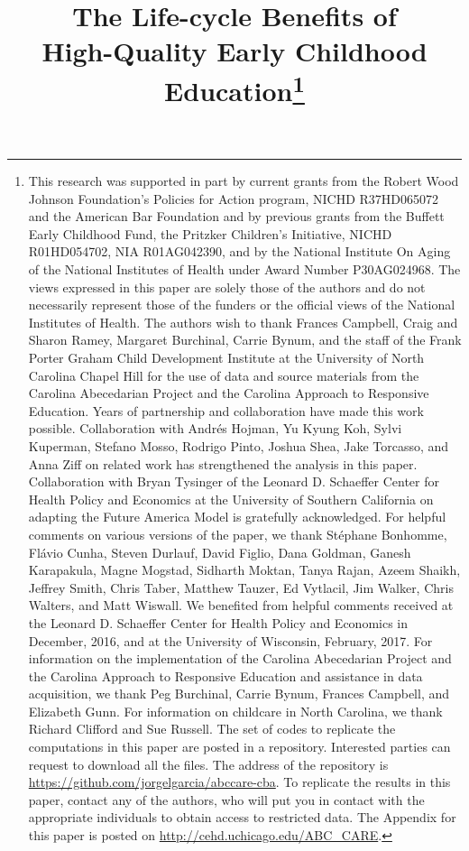 \begin{titlepage}
\title{\Large \textbf{The Life-cycle Benefits of \\ High-Quality Early Childhood Education}\thanks{This research was supported in part by current grants from the Robert Wood Johnson Foundation's Policies for Action program, NICHD R37HD065072 and the American Bar Foundation and by previous grants from the Buffett Early Childhood Fund, the Pritzker Children's Initiative, NICHD R01HD054702, NIA R01AG042390, and by the National Institute On Aging of the National Institutes of Health under Award Number P30AG024968. The views expressed in this paper are solely those of the authors and do not necessarily represent those of the funders or the official views of the National Institutes of Health. The authors wish to thank Frances Campbell, Craig and Sharon Ramey, Margaret Burchinal, Carrie Bynum, and the staff of the Frank Porter Graham Child Development Institute at the University of North Carolina Chapel Hill for the use of data and source materials from the Carolina Abecedarian Project and the Carolina Approach to Responsive Education. Years of partnership and collaboration have made this work possible. Collaboration with Andr\'{e}s Hojman, Yu Kyung Koh, Sylvi Kuperman, Stefano Mosso, Rodrigo Pinto, Joshua Shea, Jake Torcasso, and Anna Ziff on related work has strengthened the analysis in this paper. Collaboration with Bryan Tysinger of the Leonard D. Schaeffer Center for Health Policy and Economics at the University of Southern California on adapting the Future America Model is gratefully acknowledged. For helpful comments on various versions of the paper, we thank St\'{e}phane Bonhomme, Fl\'{a}vio Cunha, Steven Durlauf, David Figlio, Dana Goldman, Ganesh Karapakula, Magne Mogstad, Sidharth Moktan, Tanya Rajan, Azeem Shaikh, Jeffrey Smith, Chris Taber, Matthew Tauzer, Ed Vytlacil, Jim Walker, Chris Walters, and Matt Wiswall. We benefited from helpful comments received at the Leonard D. Schaeffer Center for Health Policy and Economics in December, 2016, and at the University of Wisconsin, February, 2017. For information on the implementation of the Carolina Abecedarian Project and the Carolina Approach to Responsive Education and assistance in data acquisition, we thank Peg Burchinal, Carrie Bynum, Frances Campbell, and Elizabeth Gunn. For information on childcare in North Carolina, we thank Richard Clifford and Sue Russell. The set of codes to replicate the computations in this paper are posted in a repository. Interested parties can request to download all the files. The address of the repository is \url{https://github.com/jorgelgarcia/abccare-cba}. To replicate the results in this paper, contact any of the authors, who will put you in contact with the appropriate individuals to obtain access to restricted data. The Appendix for this paper is posted on \url{http://cehd.uchicago.edu/ABC_CARE}.}}


\end{titlepage}
